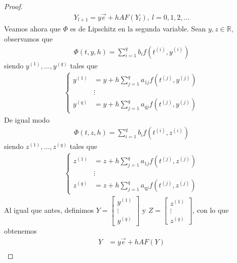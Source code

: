 \begin{proof}
    \begin{align*}
        Y_{l+1} = y\overrightarrow{e} + hAF(Y_l), \ l =0,1,2,\ldots
    \end{align*}
    Veamos ahora que $\Phi$ es de Lipschitz en la segunda variable. Sean $y,z \in \mathbb{R}$, observamos que
    \begin{align*}
        \Phi(t,y,h) = \sum_{i=1}^{q}b_if(t^{(i)},y^{(i)})
    \end{align*}
    siendo $y^{(1)},\ldots,y^{(q)}$ tales que
    \begin{align*}
        \left\{ \begin{array}{lcc}
                    y^{(1)} & = y + h\sum_{j=1}^{q}a_{1j}f(t^{(j)},y^{(j)}) \\
                            & \vdots                                        \\
                    y^{(q)} & = y + h\sum_{j=1}^{q}a_{qj}f(t^{(j)},y^{(j)})
                \end{array}
        \right.
    \end{align*}
    De igual modo
    \begin{align*}
        \Phi(t,z,h) = \sum_{i=1}^{q}b_if(t^{(i)},z^{(i)})
    \end{align*}
    siendo $z^{(1)},\ldots,z^{(q)}$ tales que
    \begin{align*}
        \left\{ \begin{array}{lcc}
                    z^{(1)} & = z + h\sum_{j=1}^{q}a_{1j}f(t^{(j)},z^{(j)}) \\
                            & \vdots                                        \\
                    z^{(q)} & = z + h\sum_{j=1}^{q}a_{qj}f(t^{(j)},z^{(j)})
                \end{array}
        \right.
    \end{align*}
    Al igual que antes, definimos $Y = \begin{bmatrix}
            y^{(1)} \\
            \vdots  \\
            y^{(q)}
        \end{bmatrix}$ y $Z = \begin{bmatrix}
            z^{(1)} \\
            \vdots  \\
            z^{(q)}
        \end{bmatrix}$, con lo que obtenemos
    \begin{align*}
        Y & = y\overrightarrow{e} + hAF(Y) \\

\end{align*}
\end{proof}

